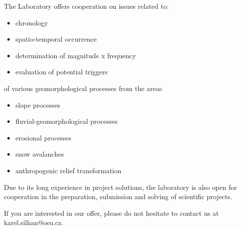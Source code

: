 {The Laboratory offers cooperation on issues related to: 
\begin{itemize}
	\itemsep0em 
	\item chronology
	\item spatio-temporal occurrence
	\item determination of magnitude x frequency
	\item evaluation of potential triggers
\end{itemize}	
of various geomorphological processes from the areas
\begin{itemize}
	\itemsep0em 	
	\item slope processes
	\item fluvial-geomorphological processes
	\item erosional processes
	\item snow avalanches
	\item anthropogenic relief transformation
\end{itemize}		
Due to its long experience in project solutions, the laboratory is also open for cooperation in the preparation, submission and solving of scientific projects.
	
If you are interested in our offer, please do not hesitate to contact us at karel.silhan@osu.cz.
}
{
}

